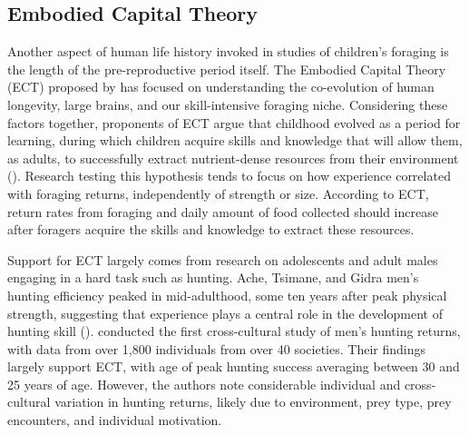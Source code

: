 \subsection{Embodied Capital Theory}
Another aspect of human life history invoked in studies of children’s foraging is the length of the pre-reproductive period itself. The Embodied Capital Theory (ECT) proposed by \cite{kaplan_theory_2000} has focused on understanding the co-evolution of human longevity, large brains, and our skill-intensive foraging niche. Considering these factors together, proponents of ECT argue that childhood evolved as a period for learning, during which children acquire skills and knowledge  that will allow them, as adults, to successfully extract nutrient-dense resources from their environment (\cite{kaplan_theory_2000, kaplan_embodied_2001, kaplan_embodied_2003, kaplan_neural_2003, kaplan_evolution_2007, kaplan_theory_1996, kaplan_evolution_1997, kaplan_life_2006, kaplan_emergence_2002}). Research testing this hypothesis tends to focus on how experience correlated with foraging returns, independently of strength or size. According to ECT, return rates from foraging and daily amount of food collected should increase after foragers acquire the skills and knowledge to extract these resources. 

Support for ECT largely comes from research on adolescents and adult males engaging in a hard task such as hunting. Ache, Tsimane, and Gidra men’s hunting efficiency peaked in mid-adulthood, some ten years after peak physical strength, suggesting that experience plays a central role in the development of hunting skill (\cite{walker_age-dependency_2002, gurven_how_2006, ohtsuka_hunting_1989}). \cite{koster_life_2020} conducted the first cross-cultural study of men’s hunting returns, with data from over 1,800 individuals from over 40 societies. Their findings largely support ECT, with age of peak hunting success averaging between 30 and 25 years of age. However, the authors note considerable individual and cross-cultural variation in hunting returns, likely due to environment, prey type, prey encounters, and individual motivation. 

